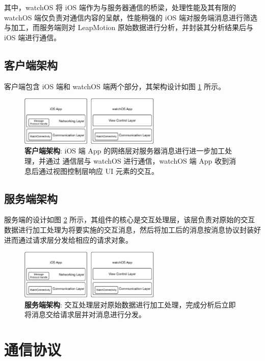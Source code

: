 其中，watchOS 将 iOS 端作为与服务器通信的桥梁，处理性能及其有限的 watchOS 端仅负责对通信内容的呈献，性能稍强的 iOS 端对服务端消息进行筛选与加工，而服务端则对 LeapMotion 原始数据进行分析，并封装其分析结果后与 iOS 端进行通信。

\subsection{客户端架构}

客户端包含 iOS 端和 watchOS 端两个部分，其架构设计如图 \ref{fig:client-arch} 所示。

\begin{figure}[H]
    \centering
    \includegraphics[width=0.6\textwidth]{figures/client-arch}
    \caption{\kaishu \textbf{客户端架构}: iOS 端 App 的网络层对服务器消息进行进一步加工处理，并通过 通信层与 watchOS 进行通信，watchOS 端 App 收到消息后通过视图控制层响应 UI 元素的交互。}
    \label{fig:client-arch}
\end{figure}

\subsection{服务端架构}

服务端的设计如图 \ref{fig:server-arch} 所示，其组件的核心是交互处理层，该层负责对原始的交互数据进行加工处理为将要实施的交互消息，然后将加工后的消息按消息协议封装好进而通过请求层分发给相应的请求对象。

\begin{figure}[H]
    \centering
    \includegraphics[width=0.6\textwidth]{figures/client-arch}
    \caption{\kaishu \textbf{服务端架构}: 交互处理层对原始数据进行加工处理，完成分析后立即将消息交给请求层并对消息进行分发。}
    \label{fig:server-arch}
\end{figure}

\section{通信协议}

